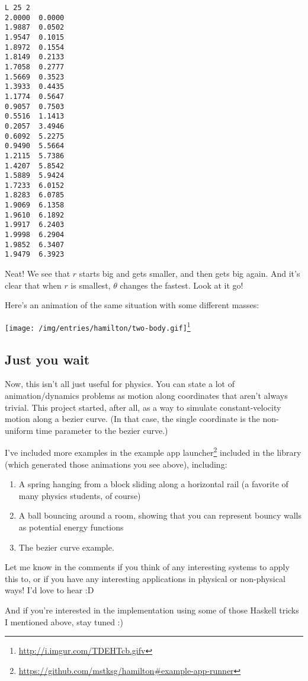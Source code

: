 \documentclass[]{article}
\renewcommand{\href}[2]{#2\footnote{\url{#1}}}
\begin{document}
\begin{verbatim}
L 25 2
2.0000  0.0000
1.9887  0.0502
1.9547  0.1015
1.8972  0.1554
1.8149  0.2133
1.7058  0.2777
1.5669  0.3523
1.3933  0.4435
1.1774  0.5647
0.9057  0.7503
0.5516  1.1413
0.2057  3.4946
0.6092  5.2275
0.9490  5.5664
1.2115  5.7386
1.4207  5.8542
1.5889  5.9424
1.7233  6.0152
1.8283  6.0785
1.9069  6.1358
1.9610  6.1892
1.9917  6.2403
1.9998  6.2904
1.9852  6.3407
1.9479  6.3923
\end{verbatim}

Neat! We see that \(r\) starts big and gets smaller, and then gets big again.
And it's clear that when \(r\) is smallest, \(\theta\) changes the fastest. Look
at it go!

Here's an animation of the same situation with some different masses:

\href{http://i.imgur.com/TDEHTcb.gifv}{\texttt{[image: /img/entries/hamilton/two-body.gif]}}

\subsection{Just you wait}\label{just-you-wait}

Now, this isn't all just useful for physics. You can state a lot of
animation/dynamics problems as motion along coordinates that aren't always
trivial. This project started, after all, as a way to simulate constant-velocity
motion along a bezier curve. (In that case, the single coordinate is the
non-uniform time parameter to the bezier curve.)

I've included more examples in the
\href{https://github.com/mstksg/hamilton\#example-app-runner}{example app
launcher} included in the library (which generated those animations you see
above), including:

\begin{enumerate}
\def\labelenumi{\arabic{enumi}.}
\tightlist
\item
  A spring hanging from a block sliding along a horizontal rail (a favorite of
  many physics students, of course)
\item
  A ball bouncing around a room, showing that you can represent bouncy walls as
  potential energy functions
\item
  The bezier curve example.
\end{enumerate}

Let me know in the comments if you think of any interesting systems to apply
this to, or if you have any interesting applications in physical or non-physical
ways! I'd love to hear :D

And if you're interested in the implementation using some of those Haskell
tricks I mentioned above, stay tuned :)
\end{document}
